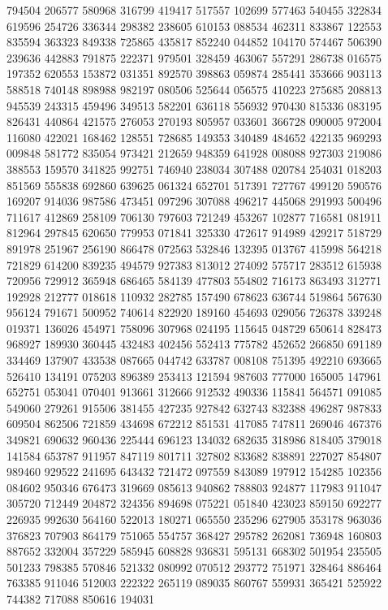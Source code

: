 {794504 206577 580968 316799 419417 517557 102699 577463 540455 322834 619596%
254726 336344 298382 238605 610153 088534 462311 833867 122553 835594 363323%
849338 725865 435817 852240 044852 104170 574467 506390 239636 442883 791875%
222371 979501 328459 463067 557291 286738 016575 197352 620553 153872 031351%
892570 398863 059874 285441 353666 903113 588518 740148 898988 982197 080506%
525644 056575 410223 275685 208813 945539 243315 459496 349513 582201 636118%
556932 970430 815336 083195 826431 440864 421575 276053 270193 805957 033601%
366728 090005 972004 116080 422021 168462 128551 728685 149353 340489 484652%
422135 969293 009848 581772 835054 973421 212659 948359 641928 008088 927303%
219086 388553 159570 341825 992751 746940 238034 307488 020784 254031 018203%
851569 555838 692860 639625 061324 652701 517391 727767 499120 590576 169207%
914036 987586 473451 097296 307088 496217 445068 291993 500496 711617 412869%
258109 706130 797603 721249 453267 102877 716581 081911 812964 297845 620650%
779953 071841 325330 472617 914989 429217 518729 891978 251967 256190 866478%
072563 532846 132395 013767 415998 564218 721829 614200 839235 494579 927383%
813012 274092 575717 283512 615938 720956 729912 365948 686465 584139 477803%
554802 716173 863493 312771 192928 212777 018618 110932 282785 157490 678623%
636744 519864 567630 956124 791671 500952 740614 822920 189160 454693 029056%
726378 339248 019371 136026 454971 758096 307968 024195 115645 048729 650614%
828473 968927 189930 360445 432483 402456 552413 775782 452652 266850 691189%
334469 137907 433538 087665 044742 633787 008108 751395 492210 693665 526410%
134191 075203 896389 253413 121594 987603 777000 165005 147961 652751 053041%
070401 913661 312666 912532 490336 115841 564571 091085 549060 279261 915506%
381455 427235 927842 632743 832388 496287 987833 609504 862506 721859 434698%
672212 851531 417085 747811 269046 467376 349821 690632 960436 225444 696123%
134032 682635 318986 818405 379018 141584 653787 911957 847119 801711 327802%
833682 838891 227027 854807 989460 929522 241695 643432 721472 097559 843089%
197912 154285 102356 084602 950346 676473 319669 085613 940862 788803 924877%
117983 911047 305720 712449 204872 324356 894698 075221 051840 423023 859150%
692277 226935 992630 564160 522013 180271 065550 235296 627905 353178 963036%
376823 707903 864179 751065 554757 368427 295782 262081 736948 160803 887652%
332004 357229 585945 608828 936831 595131 668302 501954 235505 501233 798385%
570846 521332 080992 070512 293772 751971 328464 886464 763385 911046 512003%
222322 265119 089035 860767 559931 365421 525922 744382 717088 850616 194031%
}
